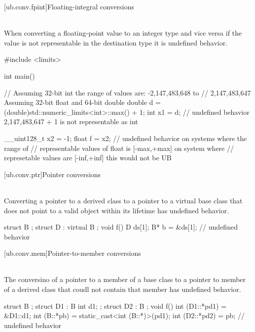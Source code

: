 {[ub.conv.fpint]{Floating-integral conversions}

\pnum
{} \\
When converting a floating-point value to an integer type and vice versa if
the value is not representable in the destination type it is undefined behavior.

\pnum
\begin{example}
\begin{codeblock}
#include <limits>

int main() {
  // Assuming 32-bit int the range of values are: -2,147,483,648 to
  // 2,147,483,647 Assuming 32-bit float and 64-bit double
  double d = (double)std::numeric_limits<int>::max() + 1;
  int x1 = d;   // undefined behavior 2,147,483,647 + 1 is not representable as int

  __uint128_t x2 = -1;
  float f = x2; // undefined behavior on systems where the range of
                // representable values of float is [-max,+max] on system where
                // represetable values are [-inf,+inf] this would not be UB
}
\end{codeblock}
\end{example}

[ub.conv.ptr]{Pointer conversions}

\pnum
{} \\
Converting
a pointer to a derived class 
to
a pointer to a virtual base class 
that does not point to
a valid object
within its lifetime
has undefined behavior.

\pnum
\begin{example}
\begin{codeblock}
struct B {};
struct D : virtual B {};
void f()
{
  D ds[1];
  B* b = &ds[1];    // undefined behavior
}
\end{codeblock}
\end{example}

[ub.conv.mem]{Pointer-to-member conversions}

\pnum
{} \\
The conversino of
a pointer to a member of a base class
to a pointer to member of a derived class
that coudl not contain that member
has undefined behavior.

\pnum
\begin{example}
\begin{codeblock}
struct B {};
struct D1 : B { int d1; };
struct D2 : B {};
void f()
{
  int (D1::*pd1) = &D1::d1;
  int (B::*pb) = static_cast<int (B::*)>(pd1);
  int (D2::*pd2) = pb;  // undefined behavior
}
\end{codeblock}
\end{example}



}
